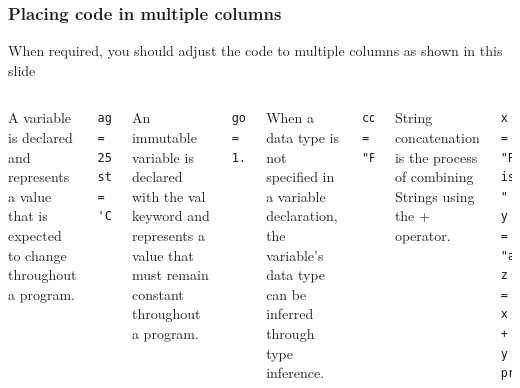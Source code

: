 \documentclass[aspectratio=169]{beamer}
\begin{document}
\begin{frame}[fragile]
\frametitle{Placing code in multiple columns}
When required, you should adjust the code to multiple columns as shown in this slide
\begin{columns}
A variable is declared and represents a value that is expected to change throughout a program.
\begin{lstlisting}
age = 25
string = 'Cadena'  
\end{lstlisting}

An immutable variable is declared with the val keyword and represents a value that must remain constant throughout a program.
\begin{lstlisting}
goldenRatio = 1.618
\end{lstlisting}


When a data type is not specified in a variable declaration, the variable’s data type can be inferred through type inference.
\begin{lstlisting}
color = "Purple" 
\end{lstlisting}


String concatenation is the process of combining Strings using the + operator.

\begin{lstlisting}
x = "Python is "
y = "awesome"
z =  x + y
print(z)
\end{lstlisting}
\end{columns}
\end{frame}
\end{document}

